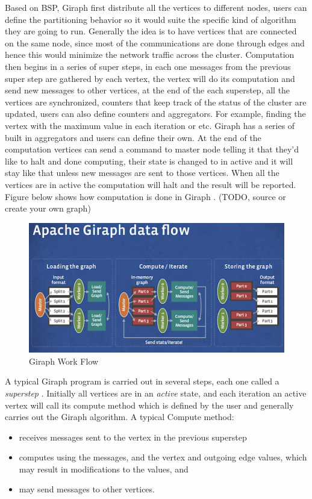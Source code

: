 \documentclass[english]{tktltiki}
\begin{document}
Based on BSP, Giraph first distribute all the vertices to different nodes, users can define the partitioning behavior so it would suite the specific kind of algorithm they are going to run. Generally the idea is to have vertices that are connected on the same node, since most of the communications are done through edges and hence this would minimize the network traffic across the cluster. Computation then begins in a series of super steps, in each one messages from the previous super step are gathered by each vertex, the vertex will do its computation and send new messages to other vertices, at the end of the each superstep, all the vertices are synchronized, counters that keep track of the status of the cluster are updated, users can also define counters and aggregators. For example, finding the vertex with the maximum value in each iteration or etc. Giraph has a series of built in aggregators and users can define their own. At the end of the computation vertices can send a command to master node telling it that they'd like to halt and done computing, their state is changed to in active and it will stay like that unless new messages are sent to those vertices. When all the vertices are in active the computation will halt and the result will be reported.
Figure below shows how computation is done in Giraph . (TODO, source or create your own graph)
\begin{figure}[ht!]
\centering
\includegraphics[width=130mm]{figures/giraphdataflow.png}
\caption{Giraph Work Flow}
\end{figure}
A typical Giraph program is carried out in several steps, each one called a \textit{superstep} . Initially all vertices are in an \textit{active} state, and each iteration an active vertex will call its compute method which is defined by the user and generally carries out the Giraph algorithm. A typical Compute method:
\begin{itemize}
\item
receives messages sent to the vertex in the previous superstep
\item
computes using the messages, and the vertex and outgoing edge values, which may result in modifications to the values, and
\item
may send messages to other vertices.
\end{itemize}
\end{document}
